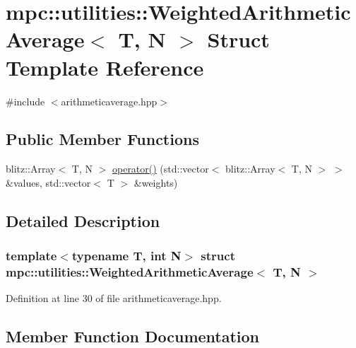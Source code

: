 \hypertarget{structmpc_1_1utilities_1_1_weighted_arithmetic_average}{}\section{mpc\+:\+:utilities\+:\+:Weighted\+Arithmetic\+Average$<$ T, N $>$ Struct Template Reference}
\label{structmpc_1_1utilities_1_1_weighted_arithmetic_average}


{\ttfamily \#include $<$arithmeticaverage.\+hpp$>$}

\subsection*{Public Member Functions}
\begin{DoxyCompactItemize}
\item 
blitz\+::\+Array$<$ T, N $>$ \mbox{\hyperlink{structmpc_1_1utilities_1_1_weighted_arithmetic_average_abbb9a8717b9feb14086f7ef170b70584}{operator()}} (std\+::vector$<$ blitz\+::\+Array$<$ T, N $>$ $>$ \&values, std\+::vector$<$ T $>$ \&weights)
\end{DoxyCompactItemize}


\subsection{Detailed Description}
\subsubsection*{template$<$typename T, int N$>$\newline
struct mpc\+::utilities\+::\+Weighted\+Arithmetic\+Average$<$ T, N $>$}



Definition at line 30 of file arithmeticaverage.\+hpp.



\subsection{Member Function Documentation}
\mbox{\label{structmpc_1_1utilities_1_1_weighted_arithmetic_average_abbb9a8717b9feb14086f7ef170b70584}} 
